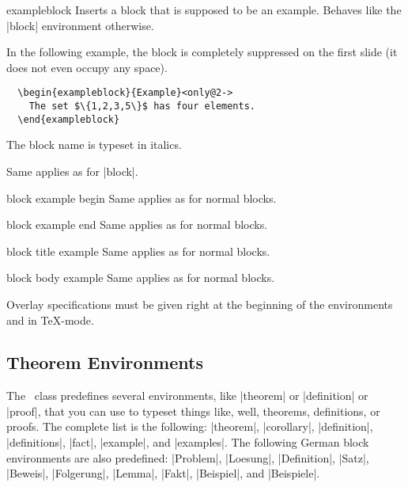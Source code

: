 \begin{environment}{{exampleblock}} 
  Inserts a block that is supposed to be an example. Behaves like the
  |block| environment otherwise.
  
  \example In the following example, the block is completely
  suppressed on the first slide (it does not even occupy any space).
\begin{verbatim}
  \begin{exampleblock}{Example}<only@2->
    The set $\{1,2,3,5\}$ has four elements.
  \end{exampleblock}
\end{verbatim}

  \articlenote
  The block name is typeset in italics.

  \lyxnote
  Same applies as for |block|.

  \begin{element}{block example begin}\yes\no\no
    Same applies as for normal blocks.
  \end{element}

  \begin{element}{block example end}\yes\no\no
    Same applies as for normal blocks.
  \end{element}

  \begin{element}{block title example}\no\yes\yes
    Same applies as for normal blocks.
  \end{element}

  \begin{element}{block body example}\no\yes\yes
    Same applies as for normal blocks.
  \end{element}
\end{environment}

\lyxnote
Overlay specifications must be given right at the beginning of the
environments and in \TeX-mode.



\subsection{Theorem Environments}
\label{section-theorems}

The \beamer\ class predefines several environments, like |theorem| or
|definition| or |proof|, that you can use to typeset things like,
well, theorems, definitions, or proofs. The complete list is the
following:  |theorem|, |corollary|, |definition|,
|definitions|, |fact|, |example|, and |examples|. The following German
block environments are also predefined: |Problem|, |Loesung|,
|Definition|, |Satz|, |Beweis|, |Folgerung|, |Lemma|, |Fakt|,
|Beispiel|, and |Beispiele|.


